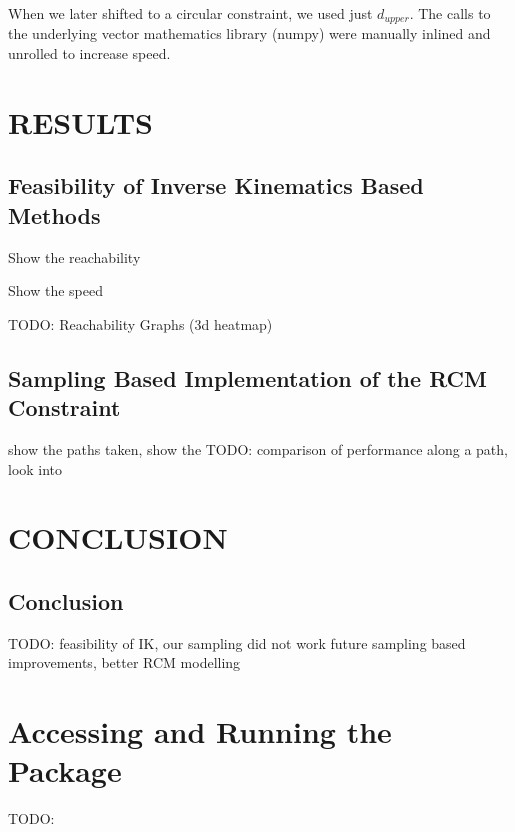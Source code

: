\documentclass[BTech]{iitmdiss}
\begin{document}
    When we later shifted to a circular constraint, we used just $d_{upper}$.
    The calls to the underlying vector mathematics library (numpy) were manually inlined and unrolled to increase speed.


    \chapter{RESULTS}\label{ch:results}


    \section{Feasibility of Inverse Kinematics Based Methods}

    Show the reachability

    Show the speed

    TODO: Reachability Graphs (3d heatmap)


    \section{Sampling Based Implementation of the RCM Constraint}

    show the paths taken, show the
    TODO: comparison of performance along a path, look into


    \chapter{CONCLUSION}\label{ch:conclusion}


    \section{Conclusion}

    TODO: feasibility of IK, our sampling did not work future sampling based improvements, better RCM modelling



    \appendix


    \chapter{Accessing and Running the Package} \label{ch:code}

    TODO:

    \begin{singlespace}
        
    \end{singlespace}
\end{document}
